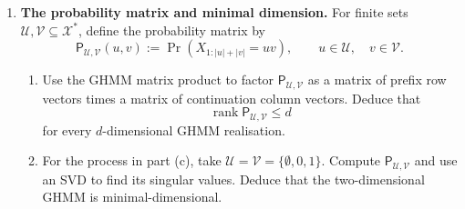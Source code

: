 \begin{exercise}
\begin{enumerate}
    \item \textbf{The probability matrix and minimal dimension.}
      For finite sets $\mathcal U,\mathcal V\subseteq\mathcal X^*$, define
      the probability matrix by
      \[
        \mathsf P_{\mathcal U,\mathcal V}(u,v)
          :=\Pr(X_{1:|u|+|v|}=uv),
        \qquad u\in\mathcal U,\quad v\in\mathcal V.
      \]
      \begin{enumerate}
        \item Use the GHMM matrix product to factor
          $\mathsf P_{\mathcal U,\mathcal V}$ as a matrix of prefix row
          vectors times a matrix of continuation column vectors. Deduce that
          \[
            \operatorname{rank}\mathsf P_{\mathcal U,\mathcal V}\leq d
          \]
          for every $d$-dimensional GHMM realisation.

        \item For the process in part (c), take
          $\mathcal U=\mathcal V=\{\emptyset,0,1\}$. Compute
          $\mathsf P_{\mathcal U,\mathcal V}$ and use an SVD to find its
          singular values. Deduce that the two-dimensional GHMM is
          minimal-dimensional.
      \end{enumerate}

  \end{enumerate}
\end{exercise}
